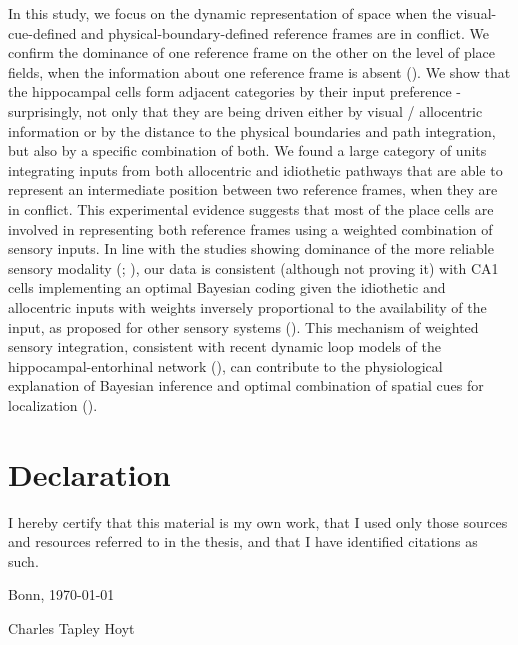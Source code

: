 \documentclass[twoside, 12pt,  footinclude=true,  headinclude=true,  cleardoublepage=empty]{scrbook}
\begin{document}
In this study, we focus on the dynamic representation of space when the visual-cue-defined and physical-boundary-defined reference frames are in conflict. We confirm the dominance of one reference frame on the other on the level of place fields, when the information about one reference frame is absent (\cite{Gothard2001}). We show that the hippocampal cells form adjacent categories by their input preference - surprisingly, not only that they are being driven either by visual / allocentric information or by the distance to the physical boundaries and path integration, but also by a specific combination of both. We found a large category of units integrating inputs from both allocentric and idiothetic pathways that are able to represent an intermediate position between two reference frames, when they are in conflict. This experimental evidence suggests that most of the place cells are involved in representing both reference frames using a weighted combination of sensory inputs. In line with the studies showing dominance of the more reliable sensory modality (\cite{Jeffery1999}; \cite{Gothard2001}), our data is consistent (although not proving it) with CA1 cells implementing an optimal Bayesian coding given the idiothetic and allocentric inputs with weights inversely proportional to the availability of the input, as proposed for other sensory systems (\cite{Jeffery2016}). This mechanism of weighted sensory integration, consistent with recent dynamic loop models of the hippocampal-entorhinal network (\cite{Li2020}), can contribute to the physiological explanation of Bayesian inference and optimal combination of spatial cues for localization  (\cite{Cheng2007}).


\mainmatter







%

%

%

\printbibliography

\backmatter

\chapter*{Declaration}
I hereby certify that this material is my own work, that I used only those sources and resources referred to in the thesis, and that I have identified citations as such.

\vspace{0.3in}

\noindent Bonn, \today

\vspace{1in}

\noindent Charles Tapley Hoyt
\end{document}
